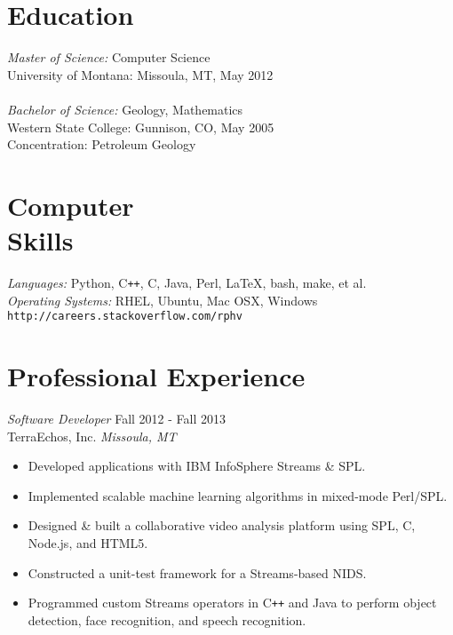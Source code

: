 \documentclass[line,margin]{res}
\begin{document}
\address{\texttt{perry@rphv.net} | 317.695.9860  }
\address{116 Strand Avenue, Missoula, MT 59801}
 
\begin{resume}
 
 
\section{\sc Education} 
        {\sl Master of Science:} Computer Science\\
        University of Montana: Missoula, MT, May 2012\\
        \\
        {\sl Bachelor of Science:} Geology, Mathematics \\
        Western State College: Gunnison, CO, May 2005 \\
        Concentration: Petroleum Geology
 
\section{\sc Computer \\ Skills}    
        {\sl Languages:} Python, C\verb!++!, C, Java, Perl, \LaTeX, bash, make, et al.\\
        {\sl Operating Systems:} RHEL, Ubuntu, Mac OSX, Windows\\
        \texttt{http://careers.stackoverflow.com/rphv}

\section{\sc Professional Experience} 
        {\sl Software Developer} \hfill  Fall 2012 - Fall 2013\\
        TerraEchos, Inc. \hfill {\sl Missoula, MT}
        \begin{itemize} \itemsep -2pt
            \item Developed applications with IBM InfoSphere\textsuperscript{\textregistered} Streams \& SPL.
            \item Implemented scalable machine learning algorithms in mixed-mode Perl/SPL. 
            \item Designed \& built a collaborative video analysis platform using SPL, C, Node.js, and HTML5.
            \item Constructed a unit-test framework for a Streams-based NIDS.
            \item Programmed custom Streams operators in C\verb!++! and Java to perform object detection, face recognition, and speech recognition.  
        \end{itemize}


\end{resume}
\end{document}
